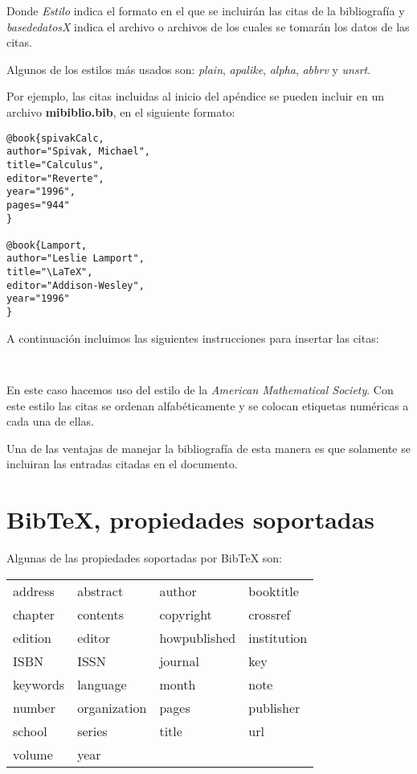 \documentclass[letterpaper,12pt]{book}
\begin{document}
Donde \emph{Estilo} indica el formato en el que se incluirán las
citas de la bibliografía y \emph{basededatosX} indica el archivo
o archivos de los cuales se tomarán los datos de las citas.

Algunos de los estilos más usados son: \emph{plain},
\emph{apalike}, \emph{alpha}, \emph{abbrv} y \emph{unsrt}.

Por ejemplo, las citas incluidas al inicio del apéndice se 
pueden incluir en un archivo \textbf{mibiblio.bib}, en el
siguiente formato:

\begin{verbatim}
@book{spivakCalc,
author="Spivak, Michael",
title="Calculus",
editor="Reverte",
year="1996",
pages="944"
}

@book{Lamport,
author="Leslie Lamport",
title="\LaTeX",
editor="Addison-Wesley",
year="1996"
}
\end{verbatim}

A continuación incluimos las siguientes instrucciones para 
insertar las citas:

\begin{verbatim}


\end{verbatim}

En este caso hacemos uso del estilo de la \emph{American 
Mathematical Society}. Con este estilo las citas se ordenan
alfabéticamente y se colocan etiquetas numéricas a cada una
de ellas.

Una de las ventajas de manejar la bibliografía de esta manera es
que solamente se incluiran las entradas citadas en el documento.

\newpage 

\section{Bib\TeX{}, propiedades soportadas}

Algunas de las propiedades soportadas por Bib\TeX{} son:

\begin{tabular}{llll}
address & abstract & author & booktitle \\
chapter & contents & copyright & crossref \\
edition & editor & howpublished & institution \\
ISBN & ISSN & journal & key \\
keywords & language & month & note \\
number & organization & pages & publisher \\
school & series & title &url \\
volume & year & & 
\end{tabular}
\end{document}
